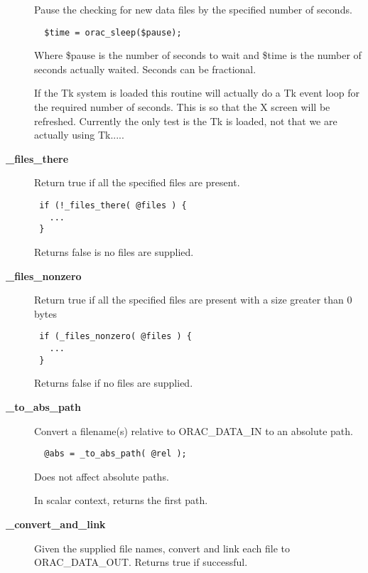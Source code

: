 \begin{description}
Pause the checking for new data files by the specified number of seconds.

\begin{verbatim}
  $time = orac_sleep($pause);
\end{verbatim}


Where \$pause is the number of seconds to wait and \$time is the number
of seconds actually waited. Seconds can be fractional.



If the Tk system is loaded this routine will actually do a Tk event loop
for the required number of seconds. This is so that the X screen will
be refreshed. Currently the only test is the Tk is loaded, not that
we are actually using Tk.....


\item[\textbf{\_files\_there}] \mbox{}

Return true if all the specified files are present.

\begin{verbatim}
 if (!_files_there( @files ) {
   ...
 }
\end{verbatim}


Returns false is no files are supplied.


\item[\textbf{\_files\_nonzero}] \mbox{}

Return true if all the specified files are present with
a size greater than 0 bytes

\begin{verbatim}
 if (_files_nonzero( @files ) {
   ...
 }
\end{verbatim}


Returns false if no files are supplied.


\item[\textbf{\_to\_abs\_path}] \mbox{}

Convert a filename(s) relative to ORAC\_DATA\_IN to an absolute path.

\begin{verbatim}
  @abs = _to_abs_path( @rel );
\end{verbatim}


Does not affect absolute paths.



In scalar context, returns the first path.


\item[\textbf{\_convert\_and\_link}] \mbox{}

Given the supplied file names, convert and link each file to ORAC\_DATA\_OUT.
Returns true if successful.


\end{description}
